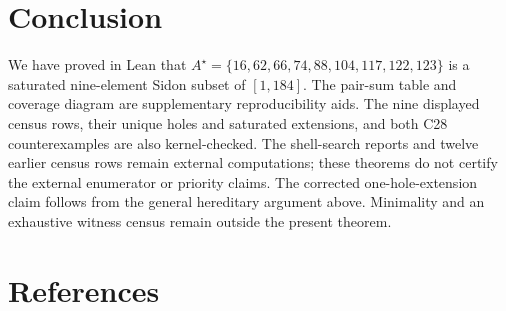 \documentclass[11pt,a4paper]{article}
\theoremstyle{definition}
\begin{document}
\section{Conclusion}

We have proved in Lean that
$A^\star=\{16,62,66,74,88,104,117,122,123\}$ is a saturated nine-element
Sidon subset of $[1,184]$. The pair-sum table and coverage diagram are
supplementary reproducibility aids. The nine displayed census rows,
their unique holes and saturated extensions, and both C28 counterexamples
are also kernel-checked. The shell-search reports and twelve earlier
census rows remain external computations; these theorems do not certify
the external enumerator or priority claims. The corrected one-hole-extension claim follows from the general
hereditary argument above. Minimality and an exhaustive witness census remain
outside the present theorem.

\section{References}
\end{document}
